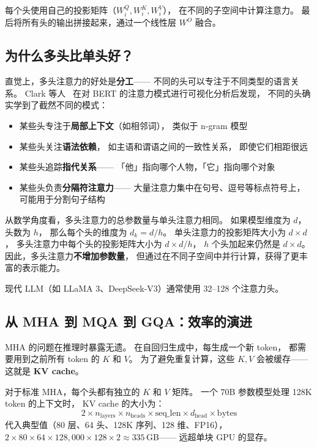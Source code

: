 每个头使用自己的投影矩阵（$W_i^Q, W_i^K, W_i^V$），
在不同的子空间中计算注意力。
最后将所有头的输出拼接起来，通过一个线性层 $W^O$ 融合。

\subsection{为什么多头比单头好？}

直觉上，多头注意力的好处是\textbf{分工}——
不同的头可以专注于不同类型的语言关系。
Clark 等人~\cite{clark2019bert}
在对 BERT 的注意力模式进行可视化分析后发现，
不同的头确实学到了截然不同的模式：

\begin{itemize}[noitemsep]
  \item 某些头专注于\textbf{局部上下文}（如相邻词），
        类似于 n-gram 模型
  \item 某些头关注\textbf{语法依赖}，
        如主语和谓语之间的一致性关系，
        即使它们相距很远
  \item 某些头追踪\textbf{指代关系}——
        「他」指向哪个人物，「它」指向哪个对象
  \item 某些头负责\textbf{分隔符注意力}——
        大量注意力集中在句号、逗号等标点符号上，
        可能用于分割句子结构
\end{itemize}

从数学角度看，多头注意力的总参数量与单头注意力相同。
如果模型维度为 $d$，头数为 $h$，
那么每个头的维度为 $d_k = d/h$。
单头注意力的投影矩阵大小为 $d \times d$，
多头注意力中每个头的投影矩阵大小为 $d \times d/h$，
$h$ 个头加起来仍然是 $d \times d$。
因此，多头注意力\textbf{不增加参数量}，
但通过在不同子空间中并行计算，获得了更丰富的表示能力。

现代 LLM（如 LLaMA 3、DeepSeek-V3）通常使用 32--128 个注意力头。

\subsection{从 MHA 到 MQA 到 GQA：效率的演进}

MHA 的问题在推理时暴露无遗。
在自回归生成中，每生成一个新 token，
都需要用到之前所有 token 的 $K$ 和 $V$。
为了避免重复计算，这些 $K, V$ 会被缓存——
这就是 \textbf{KV cache}。

对于标准 MHA，每个头都有独立的 $K$ 和 $V$ 矩阵。
一个 70B 参数模型处理 128K token 的上下文时，
KV cache 的大小为：
\[
  2 \times n_{\mathrm{layers}} \times n_{\mathrm{heads}}
  \times \mathrm{seq\_len} \times d_{\mathrm{head}} \times \mathrm{bytes}
\]
代入典型值（80 层、64 头、128K 序列、128 维、FP16），
$2 \times 80 \times 64 \times 128{,}000 \times 128 \times 2 \approx 335$\,GB——
远超单块 GPU 的显存。

